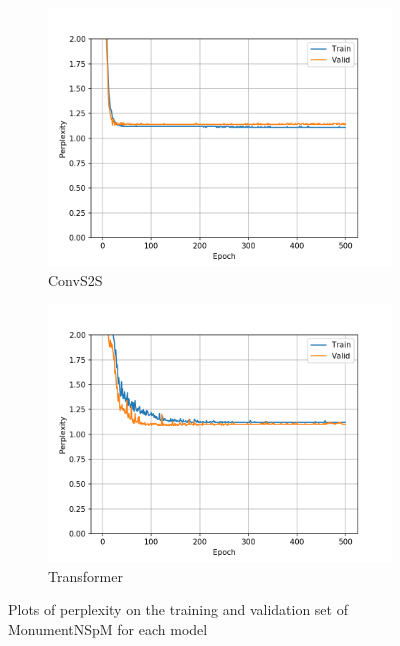 \begin{figure}[h]
\begin{subfigure}{0.3\textwidth}
\includegraphics[width=\textwidth]{../results/monument_600/run2/fconv_wmt_en_de/ppls.png} 
\caption{ConvS2S}
\label{fig:monu600 convs2s ppl}
\end{subfigure}
\hfill
\begin{subfigure}{0.3\textwidth}
\includegraphics[width=\textwidth]{../results/monument_600/run1/transformer_iwslt_de_en/ppls.png}
\caption{Transformer}
\label{fig:monu600 transformer ppl}
\end{subfigure}
\hfill
\caption{Plots of perplexity on the training and validation set of MonumentNSpM for each model}
\label{fig:monu600 ppls}
\end{figure}

